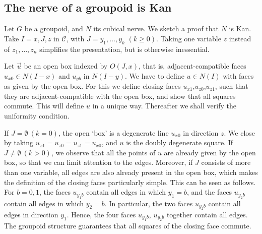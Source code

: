 \documentclass[a4paper,USenglish,draft]{lipics}
\newcommand{\CC}{{\mathcal C}}
\begin{document}
\subsection{The nerve of a groupoid is Kan}\label{sec:groupoidnerve}
Let $G$ be a groupoid, and $N$ its cubical nerve.  We sketch a proof
that $N$ is Kan. Take $I=x,J,z$ in $\CC$, with $J=y_1,\ldots,y_k$
$(k\geq 0)$. Taking one variable $z$ instead of $z_1,\ldots,z_n$
simplifies the presentation, but is otherwise inessential.

Let $\vec u$ be an open box indexed by $O(J,x)$, that is,
adjacent-compatible faces $u_{x0}\in N(I-x)$ and $u_{yb}$ in $N(I-y)$.
We have to define $u\in N(I)$ with faces as given by the open box.
For this we define closing faces $u_{x1}$,$u_{z0}$,$u_{z1}$, such that
they are adjacent-compatible with the open box, and show that all
squares commute. This will define $u$ in a unique way.  Thereafter we
shall verify the uniformity condition.

If $J=\emptyset~(k=0)$, the open `box' is a degenerate line $u_{x0}$
in direction $z$.  We close by taking $u_{x1}=u_{z0}=u_{z1}=u_{x0}$,
and $u$ is the doubly degenerate square. If $J\neq\emptyset~(k>0)$, we
observe that all the points of $u$ are already given by the open box,
so that we can limit attention to the edges.  Moreover, if $J$
consists of more than one variable, all edges are also already present
in the open box, which makes the definition of the closing faces
particularly simple. This can be seen as follows.  For $b=0,1$, the
faces $u_{y_1b}$ contain all edges in which $y_1 = b$, and the faces
$u_{y_2b}$ contain all edges in which $y_2 = b$.  In particular, the
two faces $u_{y_2b}$ contain all edges in direction $y_1$.  Hence, the
four faces $u_{y_1b}$, $u_{y_2b}$ together contain all edges.  The
groupoid structure guarantees that all squares of the closing face
commute.
\end{document}
